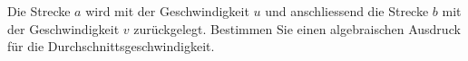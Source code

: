 Die Strecke $a$ wird mit der Geschwindigkeit $u$ und anschliessend die Strecke $b$ mit der Geschwindigkeit $v$ zurückgelegt. Bestimmen Sie einen algebraischen Ausdruck für die Durchschnittsgeschwindigkeit.
